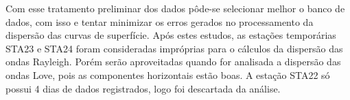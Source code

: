 Com esse tratamento preliminar dos dados pôde-se selecionar melhor o banco de dados, com isso  e tentar minimizar os erros gerados no processamento da dispersão das curvas de superfície. Após estes estudos, as estações temporárias STA23 e STA24 foram consideradas impróprias para o cálculos da dispersão das ondas Rayleigh. Porém serão aproveitadas quando for analisada a dispersão das ondas Love, pois as componentes horizontais estão boas. A estação STA22 só possui 4 dias de dados registrados, logo foi descartada da análise.
